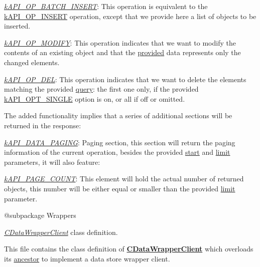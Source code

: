 \begin{DoxyItemize}
\item {\itshape \hyperlink{}{k\-A\-P\-I\-\_\-\-O\-P\-\_\-\-B\-A\-T\-C\-H\-\_\-\-I\-N\-S\-E\-R\-T}}\-: This operation is equivalent to the \hyperlink{}{k\-A\-P\-I\-\_\-\-O\-P\-\_\-\-I\-N\-S\-E\-R\-T} operation, except that we provide here a list of objects to be inserted. 
\item {\itshape \hyperlink{}{k\-A\-P\-I\-\_\-\-O\-P\-\_\-\-M\-O\-D\-I\-F\-Y}}\-: This operation indicates that we want to modify the contents of an existing object and that the \hyperlink{}{provided} data represents only the changed elements. 
\item {\itshape \hyperlink{}{k\-A\-P\-I\-\_\-\-O\-P\-\_\-\-D\-E\-L}}\-: This operation indicates that we want to delete the elements matching the provided \hyperlink{}{query}\-: the first one only, if the provided \hyperlink{}{k\-A\-P\-I\-\_\-\-O\-P\-T\-\_\-\-S\-I\-N\-G\-L\-E} option is on, or all if off or omitted. 
\end{DoxyItemize}

The added functionality implies that a series of additional sections will be returned in the response\-:


\begin{DoxyItemize}
\item {\itshape \hyperlink{}{k\-A\-P\-I\-\_\-\-D\-A\-T\-A\-\_\-\-P\-A\-G\-I\-N\-G}}\-: Paging section, this section will return the paging information of the current operation, besides the provided \hyperlink{}{start} and \hyperlink{}{limit} parameters, it will also feature\-: 
\begin{DoxyItemize}
\item {\itshape \hyperlink{}{k\-A\-P\-I\-\_\-\-P\-A\-G\-E\-\_\-\-C\-O\-U\-N\-T}}\-: This element will hold the actual number of returned objects, this number will be either equal or smaller than the provided \hyperlink{}{limit} parameter. 
\end{DoxyItemize}
\end{DoxyItemize}

\begin{DoxyVerb} @subpackage        Wrappers\end{DoxyVerb}


{\itshape \hyperlink{class_c_data_wrapper_client}{C\-Data\-Wrapper\-Client}} class definition.

This file contains the class definition of {\bfseries \hyperlink{class_c_data_wrapper_client}{C\-Data\-Wrapper\-Client}} which overloads its \hyperlink{class_c_wrapper_client}{ancestor} to implement a data store wrapper client.

